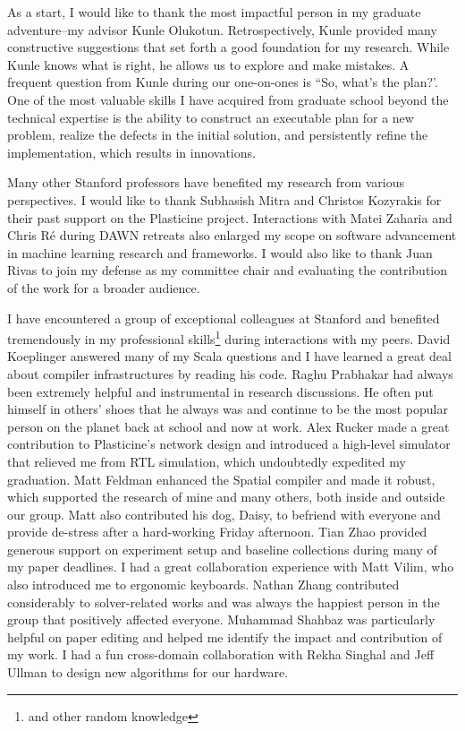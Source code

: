 
As a start, I would like to thank the most impactful person in my graduate adventure--my advisor
Kunle Olukotun.
Retrospectively, Kunle provided many constructive suggestions that set forth a good foundation for my research.
While Kunle knows what is right, he allows us to explore and make mistakes.
A frequent question from Kunle during our one-on-ones is ``So, what's the plan?'.
One of the most valuable skills I have acquired from graduate school beyond the technical expertise is the ability to construct an executable plan for a new problem, realize the defects in the initial solution, and persistently refine the implementation, which results in innovations.

Many other Stanford professors have benefited my research from various perspectives.
I would like to thank Subhasish Mitra and Christos Kozyrakis for their past support on the
Plasticine project.
Interactions with Matei Zaharia and Chris R\'e during DAWN retreats also enlarged my scope on 
software advancement in machine learning research and frameworks.
I would also like to thank Juan Rivas to join my defense as my committee chair and evaluating the
contribution of the work for a broader audience.

I have encountered a group of exceptional colleagues at Stanford and
benefited tremendously in my professional skills\footnote{and other random knowledge} during interactions with my peers.
David Koeplinger answered many of my Scala questions and I have learned a great deal about compiler
infrastructures by reading his code.
Raghu Prabhakar had always been extremely helpful and instrumental in research discussions. 
He often put himself in others' shoes that he always was and continue to be the most popular person on the planet back at school and now at work.
Alex Rucker made a great contribution to Plasticine's network design and introduced a high-level simulator that relieved me from RTL simulation, which undoubtedly expedited my graduation.
Matt Feldman enhanced the Spatial compiler and made it robust, which supported the research of mine and many
others, both inside and outside our group.
Matt also contributed his dog, Daisy, to befriend with everyone and 
provide de-stress after a hard-working Friday afternoon.
Tian Zhao provided generous support on experiment setup and baseline collections during many of my paper deadlines.
I had a great collaboration experience with Matt Vilim, who also introduced me to ergonomic keyboards.
Nathan Zhang contributed considerably to solver-related works and was always the happiest person in the group that positively affected everyone.
Muhammad Shahbaz was particularly helpful on paper editing and helped me identify the impact and contribution of my work.
I had a fun cross-domain collaboration with Rekha Singhal and Jeff Ullman to design new algorithms for our
hardware.

